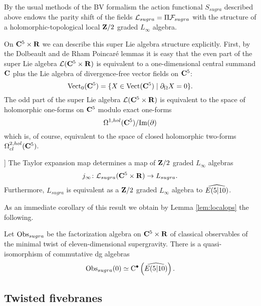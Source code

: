 \documentclass[11pt]{amsart}
\begin{document}
\parsec[s:sugraobs]

By the usual methods of the BV formalism the action functional $S_{sugra}$ described above endows the parity shift of the fields $\cL_{sugra} = \Pi \cF_{sugra}$ with the structure of a holomorphic-topological local $\Z/2$ graded $L_\infty$ algebra. 

On $\C^5 \times \R$ we can describe this super Lie algebra structure explicitly. 
First, by the Dolbeault and de Rham Poincar\'e lemmas it is easy that the even part of the super Lie algebra $\cL(\C^5 \times \R)$ is equivalent to a one-dimensional central summand $\C$ plus the Lie algebra of divergence-free vector fields on $\C^5$:
\[
\Vect_0 (\C^5) = \{X \in \Vect(\C^5) \; | \; \div X = 0\} .
\]
The odd part of the super Lie algebra $\cL(\C^5 \times \R)$ is equivalent to the space of holomorphic one-forms on $\C^5$ modulo exact one-forms
\[
\Omega^{1,hol}(\C^5) / {\rm Im}(\del) 
\]
which is, of course, equivalent to the space of closed holomorphic two-forms $\Omega^{2,hol}_{cl}(\C^5)$. 

\begin{thm}[\cite{RSW}[Theorem 2.1]]
The Taylor expansion map determines a map of $\Z/2$ graded $L_\infty$ algebras
\[
j_\infty \colon \cL_{sugra}(\C^5 \times \R) \to L_{sugra} .
\]
Furthermore, $L_{sugra}$ is equivalent as a $\Z/2$ graded $L_\infty$ algebra to $\Hat{E(5|10)}$. 
\end{thm} 

As an immediate corollary of this result we obtain by Lemma \ref{lem:localops} the following.

\begin{cor}
\label{cor:sugraops}
Let $\Obs_{sugra}$ be the factorization algebra on $\C^5 \times \R$ of classical observables of the minimal twist of eleven-dimensional supergravity.
There is a quasi-isomorphism of commutative dg algebras
\[
\Obs_{sugra} (0) \simeq \clie^\bu \left( \Hat{E(5|10)} \right) .
\]
\end{cor}


\subsection{Twisted fivebranes} 


\parsec[s:coupling]
\end{document}
